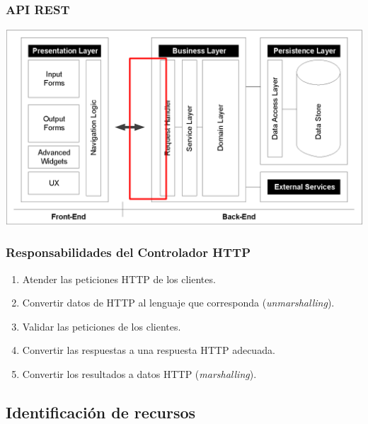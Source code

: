 \documentclass[a4paper,slidestop,xcolor=pst,blue]{beamer}
\begin{document}
\begin{frame}[c]
    \frametitle{API REST}
    \begin{center}
        \includegraphics[width=\linewidth]{images/apiRest/enterpriseArchitectures(api).eps}
    \end{center}
\end{frame}

\begin{frame}[c]
	\frametitle{Responsabilidades del Controlador HTTP}
	\begin{enumerate}[<+->]
        \item Atender las peticiones HTTP de los clientes.
        \item Convertir datos de HTTP al lenguaje que corresponda (\emph{unmarshalling}).
        \item Validar las peticiones de los clientes.
        \item Convertir las respuestas a una respuesta HTTP adecuada.
        \item Convertir los resultados a datos HTTP (\emph{marshalling}).
	\end{enumerate}
\end{frame}

\subsection{Identificación de recursos}
\end{document}
